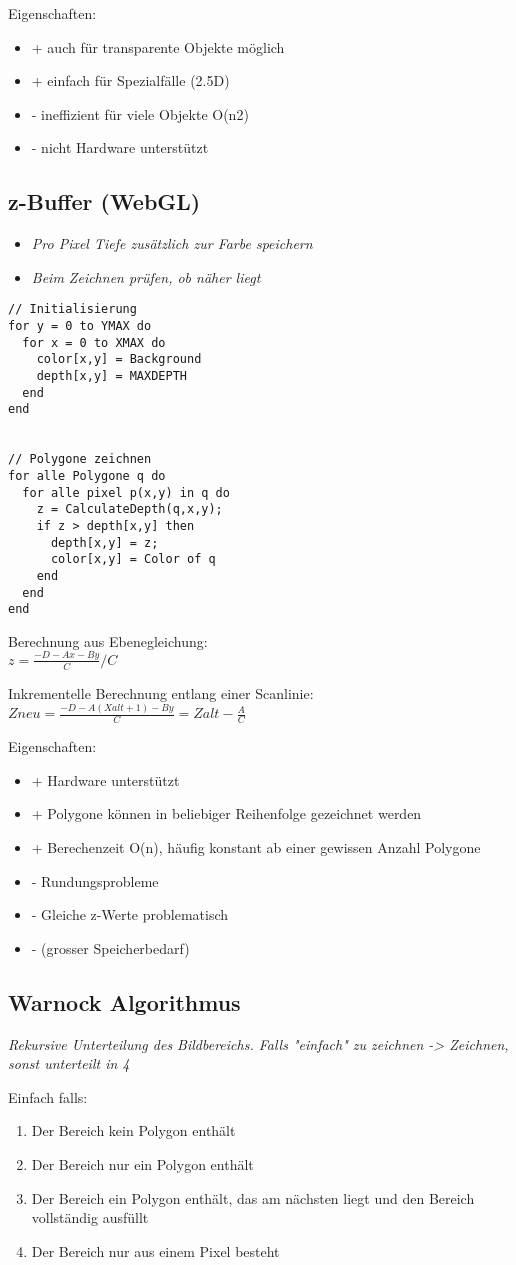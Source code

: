 Eigenschaften:
\begin{itemize}
	\item + auch für transparente Objekte möglich 
	\item + einfach für Spezialfälle (2.5D)
	\item - ineffizient für viele Objekte O(n2)
	\item - nicht Hardware unterstützt
\end{itemize}

\subsection{z-Buffer (WebGL)}
\begin{itemize}
	\item \textit{Pro Pixel Tiefe zusätzlich zur Farbe speichern}
	\item \textit{Beim Zeichnen prüfen, ob näher liegt}
\end{itemize}

\begin{lstlisting}
// Initialisierung
for y = 0 to YMAX do
  for x = 0 to XMAX do
    color[x,y] = Background
    depth[x,y] = MAXDEPTH 
  end
end


// Polygone zeichnen 
for alle Polygone q do
  for alle pixel p(x,y) in q do
    z = CalculateDepth(q,x,y); 
    if z > depth[x,y] then
      depth[x,y] = z;
      color[x,y] = Color of q 
    end
  end 
end
\end{lstlisting}

Berechnung aus Ebenegleichung: \\
$z = \frac{-D - Ax - By}{C} / C$

Inkrementelle Berechnung entlang einer Scanlinie:\\
$Zneu = \frac{-D -A(Xalt + 1) - By}{C} = Zalt - \frac{A}{C}$

Eigenschaften:
\begin{itemize}
	\item + Hardware unterstützt
	\item + Polygone können in beliebiger Reihenfolge gezeichnet werden
	\item + Berechenzeit O(n), häufig konstant ab einer gewissen Anzahl Polygone 
	\item - Rundungsprobleme
	\item - Gleiche z-Werte problematisch
	\item - (grosser Speicherbedarf)
\end{itemize}
	
\subsection{Warnock Algorithmus}
\textit{Rekursive Unterteilung des Bildbereichs. Falls "einfach" zu zeichnen -> Zeichnen, sonst unterteilt in 4}

Einfach falls:
\begin{enumerate}
	\item Der Bereich kein Polygon enthält
	\item Der Bereich nur ein Polygon enthält
	\item Der Bereich ein Polygon enthält, das am nächsten liegt und den Bereich vollständig ausfüllt 
	\item Der Bereich nur aus einem Pixel besteht
\end{enumerate}
